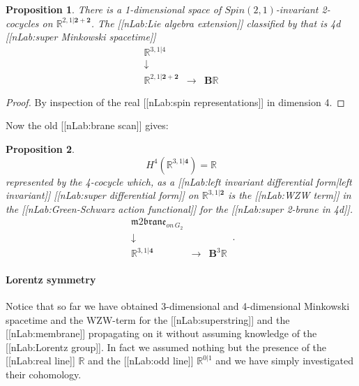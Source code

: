 \documentclass[12pt,titlepage]{article}
\newcommand{\itexarray}[1]{\begin{matrix}#1\end{matrix}}
\theoremstyle{plain}
\newtheorem{prop}{Proposition}
\theoremstyle{definition}
\theoremstyle{remark}
\begin{document}
\begin{prop}
\label{4dSuperMinkowskiSpacetime}\hypertarget{4dSuperMinkowskiSpacetime}{}
There is a 1-dimensional space of $Spin(2,1)$-invariant 2-cocycles on $\mathbb{R}^{2,1\vert \mathbf{2} + \mathbf{2}}$. The [[nLab:Lie algebra extension]] classified by that is 4d [[nLab:super Minkowski spacetime]]
\begin{displaymath}
\itexarray{
    \mathbb{R}^{3,1\vert 4}
    \\
    \downarrow
    \\
    \mathbb{R}^{2,1\vert \mathbf{2}+{\mathbf{2}}}
    &\longrightarrow&
    \mathbf{B}\mathbb{R}
  }
\end{displaymath}
\end{prop}
\begin{proof}
By inspection of the real [[nLab:spin representations]] in dimension 4.
\end{proof}
Now the old [[nLab:brane scan]] gives:
\begin{prop}
\label{TheStringIn4d}\hypertarget{TheStringIn4d}{}
\begin{displaymath}
H^4(\mathbb{R}^{3,1\vert \mathbf{4}}) = \mathbb{R}
\end{displaymath}
represented by the 4-cocycle which, as a [[nLab:left invariant differential form|left invariant]] [[nLab:super differential form]] on $\mathbb{R}^{3,1\vert \mathbf{2}}$ is the [[nLab:WZW term]] in the [[nLab:Green-Schwarz action functional]] for the [[nLab:super 2-brane in 4d]].
\begin{displaymath}
\itexarray{
     \mathfrak{m}2\mathfrak{brane}_{on\,G_2}
     \\
     \downarrow
     \\
     \mathbb{R}^{3,1\vert  \mathbf{4} }
      &\stackrel{}{\longrightarrow}&
     \mathbf{B}^3 \mathbb{R}
  }
  \,.
\end{displaymath}
\end{prop}
\hypertarget{lorentz_symmetry}{}\paragraph*{{Lorentz symmetry}}\label{lorentz_symmetry}
Notice that so far we have obtained 3-dimensional and 4-dimensional Minkowski spacetime and the WZW-term for the [[nLab:superstring]] and the [[nLab:membrane]] propagating on it without assuming knowledge of the [[nLab:Lorentz group]]. In fact we assumed nothing but the presence of the [[nLab:real line]] $\mathbb{R}$ and the [[nLab:odd line]] $\mathbb{R}^{0|1}$ and we have simply investigated their cohomology.
\end{document}
